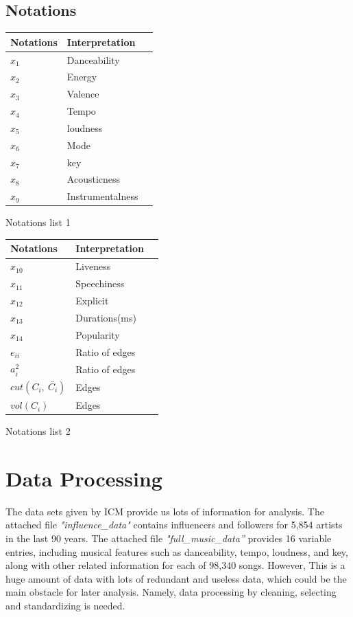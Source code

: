 \documentclass[12pt]{article}
\begin{document}
\subsection{Notations}
\begin{minipage}{\textwidth}
\begin{minipage}[t]{0.48\textwidth}
\makeatletter{}
\begin{tabular}{p{80pt}p{80pt}p{80pt}}
    \toprule
    Notations     & Interpretation\\
    \midrule
    $x_1$     & Danceability\\
	$x_2$  &  Energy\\
	$x_3$  &  Valence\\
	$x_4$  &  Tempo\\
	$x_5$  &  loudness\\
	$x_6$  &  Mode\\
	$x_7$  &  key\\
	$x_8$  &  Acousticness\\
	$x_9$  &  Instrumentalness\\
    \bottomrule
\end{tabular}
\caption{Notations list 1}
\label{Notations list 1}
\end{minipage}
\begin{minipage}[t]{0.48\textwidth}
\makeatletter{}
\begin{tabular}{p{80pt}p{80pt}p{80pt}}
    \toprule
    Notations     & Interpretation\\
    \midrule
    $x_{10}$  & Liveness\\
	$x_{11}$ &  Speechiness\\
	$x_{12}$ &  Explicit\\
	$x_{13}$  & Durations(ms)\\
	$x_{14}$  &  Popularity\\
	$e_{ii}$  & Ratio of edges\\
	$a_i^2$ & Ratio of edges\\
	$cut(C_i,\ \bar{C_i})$ & Edges\\
	$vol(C_i)$ & Edges\\
    \bottomrule
\end{tabular}
\caption{Notations list 2}
\label{Notations list 2}
\end{minipage}
\end{minipage}


\section{Data Processing}
The data sets given by ICM provide us lots of information for analysis. The attached file \emph{"influence\_data"} contains influencers and followers for 5,854 artists in the last 90 years. The attached file \emph{"full\_music\_data”} provides 16 variable entries, including musical features such as danceability, tempo, loudness, and key, along with other related information for each of 98,340 songs. However, This is a huge amount of data with lots of redundant and useless data, which could be the main obstacle for later analysis. Namely, data processing by cleaning, selecting and standardizing is needed.
\end{document}
